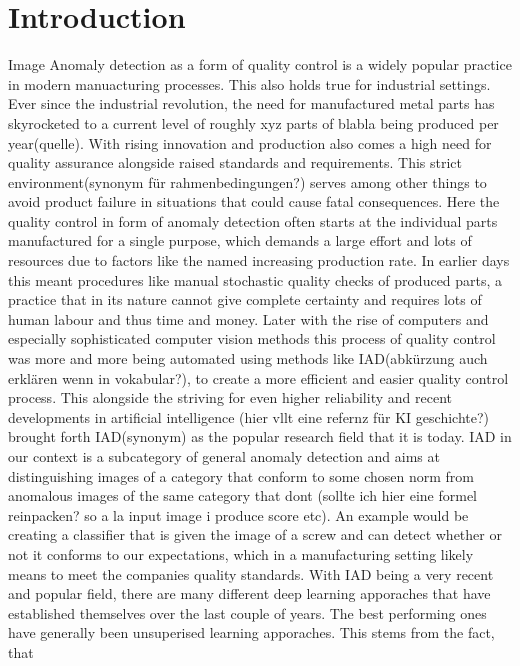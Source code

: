 \chapter{Introduction}
\label{chap:introduction}

Image Anomaly detection as a form of quality control is a widely popular practice in modern manuacturing processes. This also holds true for 
industrial settings. Ever since the industrial revolution, the need for manufactured metal parts has skyrocketed to a current level 
of roughly xyz parts of blabla being produced per year(quelle). With rising innovation and production also comes a high need for quality 
assurance alongside raised standards and requirements. This strict environment(synonym für rahmenbedingungen?) serves among other things 
to avoid product failure in situations that could cause fatal consequences. Here the quality control in form of anomaly detection often 
starts at the individual parts manufactured for a single purpose, which demands a large effort and lots of resources due to factors like 
the named increasing production rate. 
In earlier days this meant procedures like manual stochastic quality checks of produced parts, a practice that in its nature cannot give 
complete certainty and requires lots of human labour and thus time and money. Later with the rise of computers and especially sophisticated computer vision methods 
this process of quality control was more and more being automated using methods like IAD(abkürzung auch erklären wenn in vokabular?), to create 
a more efficient and easier quality control process. This 
alongside the striving for even higher reliability and recent developments in artificial intelligence (hier vllt eine refernz für KI geschichte?) 
brought forth IAD(synonym) as the popular research field that it is today. IAD in our context is a subcategory of general anomaly detection 
and aims at distinguishing images of a category that conform to some chosen norm from anomalous images of the same category that dont 
(sollte ich hier eine formel reinpacken? so a la input image i produce score etc). 
An example would be creating a classifier that is given the image of a screw and can detect whether or not it conforms to our expectations, 
which in a manufacturing setting likely means to meet the companies quality standards.
\newline
With IAD being a very recent and popular field, there are many different deep learning apporaches that have established themselves over 
the last couple of years. The best performing ones have generally been unsuperised learning apporaches. This stems from the fact, that 

